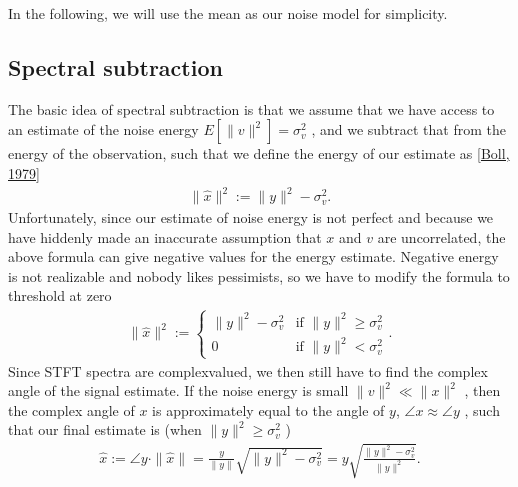\documentclass[letterpaper,10pt,english]{jupyterBook}
\begin{document}
\sphinxAtStartPar
In the following, we will use the mean as our noise model for simplicity.


\subsection{Spectral subtraction}
\label{\detokenize{Enhancement/Noise_attenuation:spectral-subtraction}}
\sphinxAtStartPar
The basic idea of spectral subtraction is that we assume that we have
access to an estimate of the noise energy \( E[\|v\|^2] = \sigma_v^2\) , and we subtract that from the energy of the observation, such that
we define the energy of our estimate as {[}\hyperlink{cite.Enhancement/Noise_attenuation:id42}{Boll, 1979}{]}
\begin{equation*}
\begin{split} \|\hat x\|^2 := \|y\|^2 - \sigma_v^2. \end{split}
\end{equation*}
\sphinxAtStartPar
Unfortunately, since our estimate of noise energy is not perfect and
because we have hiddenly made an inaccurate assumption that \(x\) and \(v\)
are uncorrelated, the above formula can give negative values for the
energy estimate. Negative energy is not realizable and nobody likes
pessimists, so we have to modify the formula to threshold at zero
\begin{equation*}
\begin{split} \|\hat x\|^2 := \begin{cases} \|y\|^2 - \sigma_v^2 & \text{if }
\|y\|^2 \geq \sigma_v^2 \\ 0 & \text{if } \|y\|^2 < \sigma_v^2
\end{cases}. \end{split}
\end{equation*}
\sphinxAtStartPar
Since STFT spectra are complex\sphinxhyphen{}valued, we then still have to find the
complex angle of the signal estimate. If the noise energy is small \(
\|v\|^2 \ll \|x\|^2 \) , then the complex angle of \(x\) is
approximately equal to the angle of \(y\), \( \angle x \approx \angle
y \) , such that our final estimate is (when \( \|y\|^2\geq
\sigma_v^2 \) )
\begin{equation*}
\begin{split} \hat x := \angle y \cdot \|\hat x\| = \frac{y}{\|y\|} \sqrt{
\|y\|^2 - \sigma_v^2} = y \sqrt{\frac{\|y\|^2 -
\sigma_v^2}{\|y\|^2}}. \end{split}
\end{equation*}
\end{document}

